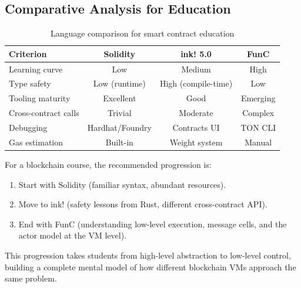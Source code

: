 \subsection{Comparative Analysis for Education}

\begin{table}[h]
\centering
\begin{tabular}{|l|c|c|c|}
\hline
\textbf{Criterion} & \textbf{Solidity} & \textbf{ink! 5.0} & \textbf{FunC} \\
\hline
Learning curve & Low & Medium & High \\
Type safety & Low (runtime) & High (compile-time) & Low \\
Tooling maturity & Excellent & Good & Emerging \\
Cross-contract calls & Trivial & Moderate & Complex \\
Debugging & Hardhat/Foundry & Contracts UI & TON CLI \\
Gas estimation & Built-in & Weight system & Manual \\
\hline
\end{tabular}
\caption{Language comparison for smart contract education}
\end{table}

For a blockchain course, the recommended progression is:
\begin{enumerate}
    \item Start with Solidity (familiar syntax, abundant resources).
    \item Move to ink! (safety lessons from Rust, different cross-contract API).
    \item End with FunC (understanding low-level execution, message cells,
          and the actor model at the VM level).
\end{enumerate}

This progression takes students from high-level abstraction to low-level control,
building a complete mental model of how different blockchain VMs approach the
same problem.